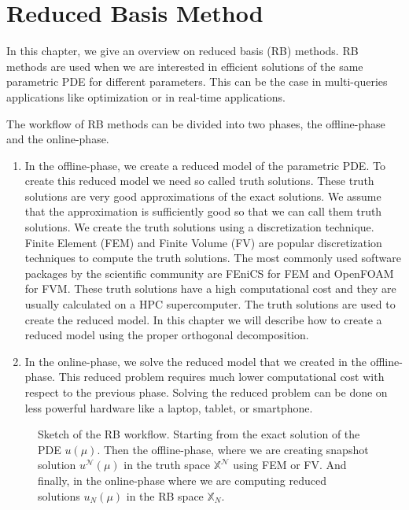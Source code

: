 \chapter{Reduced Basis Method}
In this chapter, we give an overview on reduced basis (RB) methods. 
RB methods are used when we are interested in efficient solutions of the same parametric PDE for different parameters.
This can be the case in multi-queries applications like optimization or in real-time applications.

The workflow of RB methods can be divided into two phases, the offline-phase and the online-phase.

\begin{enumerate}
	\item In the offline-phase, we create a reduced model of the parametric PDE. 
	To create this reduced model we need so called truth solutions. These truth solutions are very good approximations of the exact solutions. We assume that the approximation is sufficiently good so that we can call them truth solutions.
	We create the truth solutions using a discretization technique. Finite Element (FEM) and Finite Volume (FV) are popular discretization techniques to compute the truth solutions.
	The most commonly used software packages by the scientific community are FEniCS \cite{LoggMardalEtAl2012} for FEM and OpenFOAM \cite{articleOpenFOAM} for FVM.
	These truth solutions have a high computational cost and they are usually calculated on a HPC supercomputer.	
	The truth solutions are used to create the reduced model. In this chapter we will describe how to create a reduced model using the proper orthogonal decomposition.

	\item In the online-phase, we solve the reduced model that we created in the offline-phase.
	This reduced problem requires much lower computational cost with respect to the previous phase. Solving the reduced problem can be done on less powerful hardware like a laptop, tablet, or smartphone.
\end{enumerate}

\begin{figure}[H]
	\centering
	
	\caption[RB process]{Sketch of the RB workflow. Starting from the exact solution of the PDE $u(\mu)$.
		Then the offline-phase, where we are creating snapshot solution $u^\mathcal{ N }(\mu)$ in the truth space $\mathbb{X}^\mathcal{ N }$ using FEM or FV.
		And finally, in the online-phase where we are computing reduced solutions $u_N(\mu)$ in the RB space $\mathbb{X}_N$.}
	\label{fig:scetch}
\end{figure}

